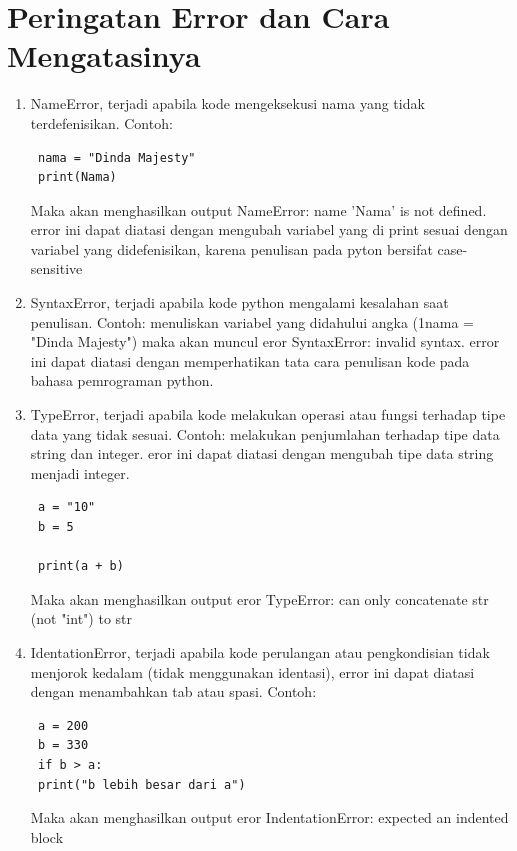 \section{Peringatan Error dan Cara Mengatasinya}
\begin{enumerate}
 \item NameError, terjadi apabila kode mengeksekusi nama yang tidak terdefenisikan. Contoh:
 \begin{verbatim}
 nama = "Dinda Majesty"
 print(Nama)
 \end{verbatim}
 Maka akan menghasilkan output NameError: name 'Nama' is not defined. error ini dapat diatasi dengan mengubah variabel yang di print sesuai dengan variabel yang didefenisikan, karena penulisan pada pyton bersifat case-sensitive
 
 \item SyntaxError, terjadi apabila kode python mengalami kesalahan saat penulisan. Contoh: menuliskan variabel yang didahului angka (1nama = "Dinda Majesty") maka akan muncul eror SyntaxError: invalid syntax. error ini dapat diatasi dengan memperhatikan tata cara penulisan kode pada bahasa pemrograman python.
 
 \item TypeError, terjadi apabila kode melakukan operasi atau fungsi terhadap tipe data yang tidak sesuai. Contoh: melakukan penjumlahan terhadap tipe data string dan integer. eror ini dapat diatasi dengan mengubah tipe data string menjadi integer.
 \begin{verbatim}
 a = "10"
 b = 5

 print(a + b)
 \end{verbatim}
 Maka akan menghasilkan output eror TypeError: can only concatenate str (not "int") to str
 
 \item IdentationError, terjadi apabila kode perulangan atau pengkondisian tidak menjorok kedalam (tidak menggunakan identasi), error ini dapat diatasi dengan menambahkan tab atau spasi. Contoh:
 \begin{verbatim}
 a = 200
 b = 330
 if b > a:
 print("b lebih besar dari a")
 \end{verbatim}
 Maka akan menghasilkan output eror IndentationError: expected an indented block
\end{enumerate}

